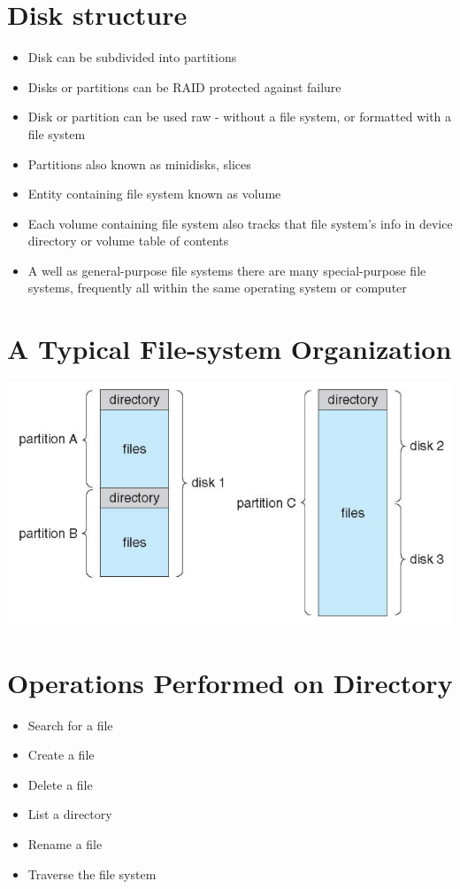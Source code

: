 \documentclass{article}[18pt]
\begin{document}
\section{Disk structure}
\begin{itemize}
	\item Disk can be subdivided into partitions
	\item Disks or partitions can be RAID protected against failure
	\item Disk or partition can be used raw - without a file system, or formatted with a file system
	\item Partitions also known as minidisks, slices
	\item Entity containing file system known as volume
	\item Each volume containing file system also tracks that file system's info in device directory or volume table of contents
	\item A well as general-purpose file systems there are many special-purpose file systems, frequently all within the same operating system or computer
\end{itemize}
\section{A Typical File-system Organization}
\begin{center}
	\includegraphics[scale=0.7]{Organisation}
\end{center}
\section{Operations Performed on Directory}
\begin{itemize}
	\item Search for a file
	\item Create a file
	\item Delete a file
	\item List a directory
	\item Rename a file
	\item Traverse the file system
\end{itemize}
\end{document}
